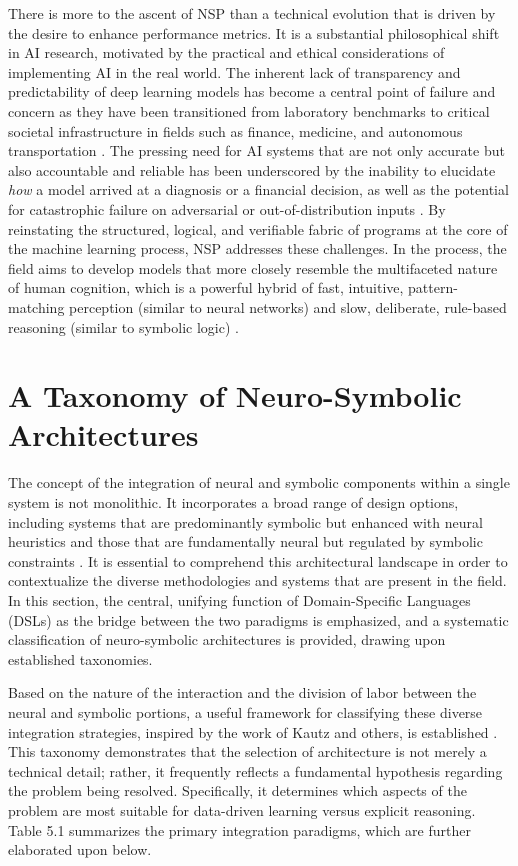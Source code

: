 \documentclass[12pt, a4paper]{report}
\begin{document}
There is more to the ascent of NSP than a technical evolution that is driven by the desire to enhance performance metrics. It is a substantial philosophical shift in AI research, motivated by the practical and ethical considerations of implementing AI in the real world. The inherent lack of transparency and predictability of deep learning models has become a central point of failure and concern as they have been transitioned from laboratory benchmarks to critical societal infrastructure in fields such as finance, medicine, and autonomous transportation \citep{gulwani2017program}. The pressing need for AI systems that are not only accurate but also accountable and reliable has been underscored by the inability to elucidate \textit{how} a model arrived at a diagnosis or a financial decision, as well as the potential for catastrophic failure on adversarial or out-of-distribution inputs \citep{gulwani2017program}. By reinstating the structured, logical, and verifiable fabric of programs at the core of the machine learning process, NSP addresses these challenges. In the process, the field aims to develop models that more closely resemble the multifaceted nature of human cognition, which is a powerful hybrid of fast, intuitive, pattern-matching perception (similar to neural networks) and slow, deliberate, rule-based reasoning (similar to symbolic logic) \citep{bunel2018leveraging}.

\section{A Taxonomy of Neuro-Symbolic Architectures}
The concept of the integration of neural and symbolic components within a single system is not monolithic. It incorporates a broad range of design options, including systems that are predominantly symbolic but enhanced with neural heuristics and those that are fundamentally neural but regulated by symbolic constraints \citep{chaudhuri2021neurosymbolic}. It is essential to comprehend this architectural landscape in order to contextualize the diverse methodologies and systems that are present in the field. In this section, the central, unifying function of Domain-Specific Languages (DSLs) as the bridge between the two paradigms is emphasized, and a systematic classification of neuro-symbolic architectures is provided, drawing upon established taxonomies.

Based on the nature of the interaction and the division of labor between the neural and symbolic portions, a useful framework for classifying these diverse integration strategies, inspired by the work of Kautz and others, is established \citep{chaudhuri2021neurosymbolic}. This taxonomy demonstrates that the selection of architecture is not merely a technical detail; rather, it frequently reflects a fundamental hypothesis regarding the problem being resolved. Specifically, it determines which aspects of the problem are most suitable for data-driven learning versus explicit reasoning. Table 5.1 summarizes the primary integration paradigms, which are further elaborated upon below.
\end{document}
